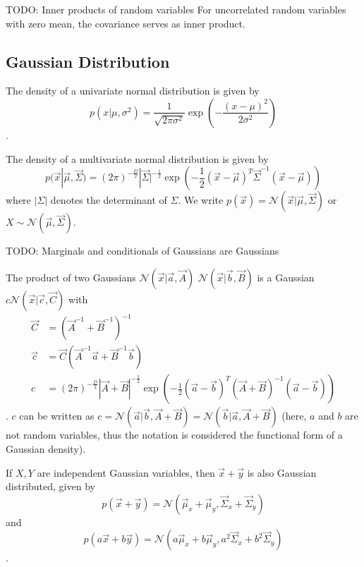 TODO: Inner products of random variables
For uncorrelated random variables with zero mean,
the covariance serves as inner product.


\subsection{Gaussian Distribution}
The density of a univariate normal distribution is given by
\begin{equation*}
    p(x | \mu, \sigma^2)
    = \frac{1}{\sqrt{2 \pi \sigma^2}}
    \exp\left(-\frac{(x - \mu)^2}{2 \sigma^2}\right)
\end{equation*}.

The density of a multivariate normal distribution is given by
\begin{equation*}
    p(\vec{x} | \vec{\mu}, \vec{\Sigma})
    = (2 \pi)^{-\frac{D}{2}} |\vec{\Sigma}|^{-\frac{1}{2}}
    \exp\left( -\frac{1}{2} (\vec{x} - \vec{\mu})^T \vec{\Sigma}^{-1} (\vec{x} - \vec{\mu}) \right)
\end{equation*}
where $|\Sigma|$ denotes the determinant of $\Sigma$.
We write $p(\vec{x}) = \mathcal{N}(\vec{x} | \vec{\mu}, \vec{\Sigma})$
or $X \sim \mathcal{N}(\vec{\mu}, \vec{\Sigma})$.

TODO: Marginals and conditionals of Gaussians are Gaussians

The product of two Gaussians
$\mathcal{N}(\vec{x} | \vec{a}, \vec{A})$
$\mathcal{N}(\vec{x} | \vec{b}, \vec{B})$ is a Gaussian
$c \mathcal{N}(\vec{x} | \vec{c}, \vec{C})$ with
\begin{align*}
    \vec{C} &= (\vec{A}^{-1} + \vec{B}^{-1})^{-1} \\
    \vec{c} &= \vec{C} (\vec{A}^{-1}\vec{a} + \vec{B}^{-1}\vec{b}) \\
    c &= (2 \pi)^{-\frac{D}{2}} |\vec{A} + \vec{B}|^{-\frac{1}{2}}
    \exp\left( -\frac{1}{2} (\vec{a} - \vec{b})^T (\vec{A} + \vec{B})^{-1} (\vec{a} - \vec{b}) \right)
\end{align*}.
$c$ can be written as
$c = \mathcal{N}(\vec{a} | \vec{b}, \vec{A} + \vec{B}) = \mathcal{N}(\vec{b} | \vec{a}, \vec{A} + \vec{B})$
(here, $a$ and $b$ are not random variables, thus the notation
is considered the functional form of a Gaussian density).

If $X, Y$ are independent Gaussian variables, then $\vec{x} + \vec{y}$
is also Gaussian distributed, given by
\begin{equation*}
    p(\vec{x} + \vec{y})
    = \mathcal{N}(\vec{\mu}_x + \vec{\mu}_y, \vec{\Sigma}_x + \vec{\Sigma}_y)
\end{equation*}
and
\begin{equation*}
    p(a\vec{x} + b\vec{y})
    = \mathcal{N}(a\vec{\mu}_x + b\vec{\mu}_y, a^2\vec{\Sigma}_x + b^2\vec{\Sigma}_y)
\end{equation*}.

